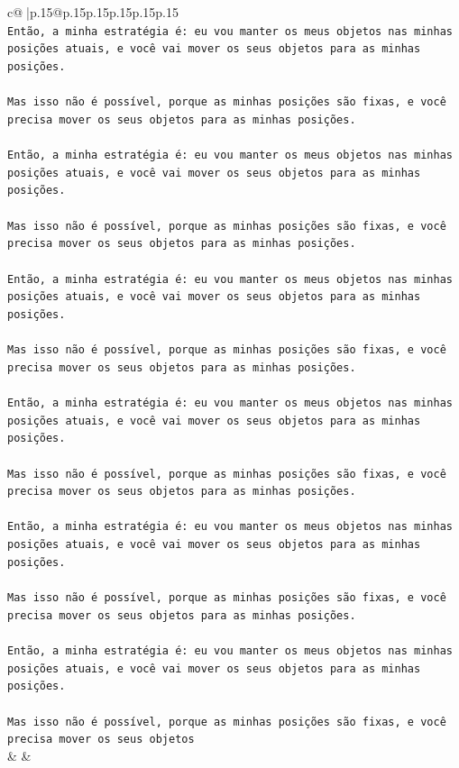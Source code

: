 \documentclass{article}
\begin{document}
{\begin{supertabular}{c@{$\;$}|p{.15\linewidth}@{}p{.15\linewidth}p{.15\linewidth}p{.15\linewidth}p{.15\linewidth}p{.15\linewidth}}
{{{\\ 
\texttt{Então, a minha estratégia é: eu vou manter os meus objetos nas minhas posições atuais, e você vai mover os seus objetos para as minhas posições.} \\
\\ 
\texttt{Mas isso não é possível, porque as minhas posições são fixas, e você precisa mover os seus objetos para as minhas posições.} \\
\\ 
\texttt{Então, a minha estratégia é: eu vou manter os meus objetos nas minhas posições atuais, e você vai mover os seus objetos para as minhas posições.} \\
\\ 
\texttt{Mas isso não é possível, porque as minhas posições são fixas, e você precisa mover os seus objetos para as minhas posições.} \\
\\ 
\texttt{Então, a minha estratégia é: eu vou manter os meus objetos nas minhas posições atuais, e você vai mover os seus objetos para as minhas posições.} \\
\\ 
\texttt{Mas isso não é possível, porque as minhas posições são fixas, e você precisa mover os seus objetos para as minhas posições.} \\
\\ 
\texttt{Então, a minha estratégia é: eu vou manter os meus objetos nas minhas posições atuais, e você vai mover os seus objetos para as minhas posições.} \\
\\ 
\texttt{Mas isso não é possível, porque as minhas posições são fixas, e você precisa mover os seus objetos para as minhas posições.} \\
\\ 
\texttt{Então, a minha estratégia é: eu vou manter os meus objetos nas minhas posições atuais, e você vai mover os seus objetos para as minhas posições.} \\
\\ 
\texttt{Mas isso não é possível, porque as minhas posições são fixas, e você precisa mover os seus objetos para as minhas posições.} \\
\\ 
\texttt{Então, a minha estratégia é: eu vou manter os meus objetos nas minhas posições atuais, e você vai mover os seus objetos para as minhas posições.} \\
\\ 
\texttt{Mas isso não é possível, porque as minhas posições são fixas, e você precisa mover os seus objetos} \\
            }
        }
    }
    & & \\ \\


\end{supertabular}}
\end{document}
